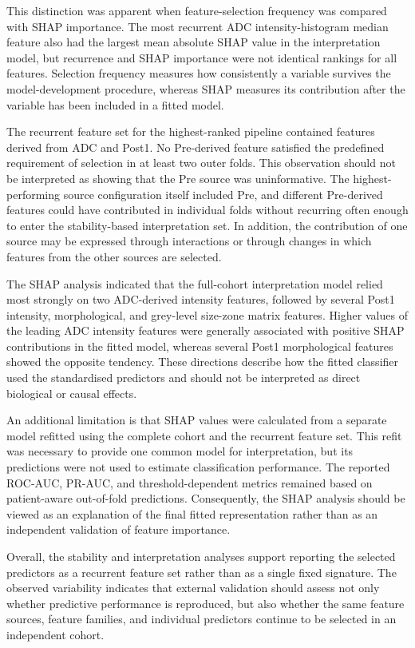 \documentclass[12pt,twocolumn]{article}
\begin{document}
This distinction was apparent when feature-selection frequency was
compared with SHAP importance. The most recurrent ADC
intensity-histogram median feature also had the largest mean absolute
SHAP value in the interpretation model, but recurrence and SHAP
importance were not identical rankings for all features. Selection
frequency measures how consistently a variable survives the
model-development procedure, whereas SHAP measures its contribution
after the variable has been included in a fitted model.

The recurrent feature set for the highest-ranked pipeline contained
features derived from ADC and Post1. No Pre-derived feature satisfied
the predefined requirement of selection in at least two outer folds.
This observation should not be interpreted as showing that the Pre
source was uninformative. The highest-performing source
configuration itself included Pre, and different Pre-derived features
could have contributed in individual folds without recurring often
enough to enter the stability-based interpretation set. In addition,
the contribution of one source may be expressed through interactions
or through changes in which features from the other sources are
selected.

The SHAP analysis indicated that the full-cohort interpretation model
relied most strongly on two ADC-derived intensity features, followed
by several Post1 intensity, morphological, and grey-level size-zone
matrix features. Higher values of the leading ADC intensity features
were generally associated with positive SHAP contributions in the
fitted model, whereas several Post1 morphological features showed the
opposite tendency. These directions describe how the fitted classifier
used the standardised predictors and should not be interpreted as
direct biological or causal effects.

An additional limitation is that SHAP values were calculated from a
separate model refitted using the complete cohort and the recurrent
feature set. This refit was necessary to provide one common model for
interpretation, but its predictions were not used to estimate
classification performance. The reported ROC-AUC, PR-AUC, and
threshold-dependent metrics remained based on patient-aware
out-of-fold predictions. Consequently, the SHAP analysis should be
viewed as an explanation of the final fitted representation rather
than as an independent validation of feature importance.

Overall, the stability and interpretation analyses support reporting
the selected predictors as a recurrent feature set rather than as a
single fixed signature. The observed variability indicates that
external validation should assess not only whether predictive
performance is reproduced, but also whether the same feature sources,
feature families, and individual predictors continue to be selected
in an independent cohort.
\end{document}
